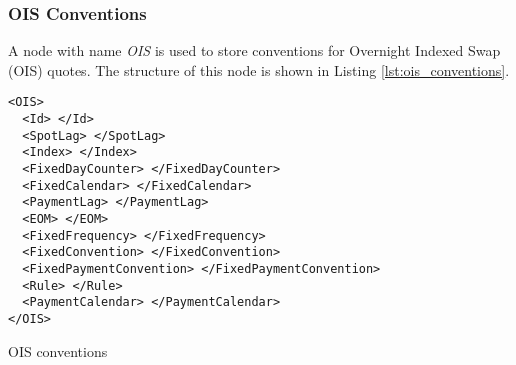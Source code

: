 \subsubsection{OIS Conventions}

A node with name \emph{OIS} is used to store conventions for Overnight Indexed Swap (OIS) quotes. The structure of this
node is shown in Listing \ref{lst:ois_conventions}.

\begin{listing}[H]
\begin{verbatim}
<OIS>
  <Id> </Id>
  <SpotLag> </SpotLag>
  <Index> </Index>
  <FixedDayCounter> </FixedDayCounter>
  <FixedCalendar> </FixedCalendar>
  <PaymentLag> </PaymentLag>
  <EOM> </EOM>
  <FixedFrequency> </FixedFrequency>
  <FixedConvention> </FixedConvention>
  <FixedPaymentConvention> </FixedPaymentConvention>
  <Rule> </Rule>
  <PaymentCalendar> </PaymentCalendar>
</OIS>
\end{verbatim}
\caption{OIS conventions}
\label{lst:ois_conventions}
\end{listing}


